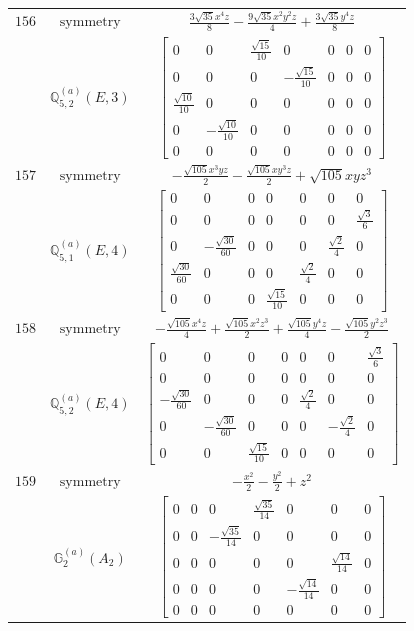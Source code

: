 \documentclass[fleqn,8pt,landscape]{jsarticle}
\begin{document}
\begin{longtable}{ccc}
$ 156 $ & $ \text{symmetry} $ & $ \frac{3 \sqrt{35} x^{4} z}{8} - \frac{9 \sqrt{35} x^{2} y^{2} z}{4} + \frac{3 \sqrt{35} y^{4} z}{8} $ \\
$  $ & $ \mathbb{Q}_{5,2}^{(a)}(E,3) $ & $ \begin{bmatrix} 0 & 0 & \frac{\sqrt{15}}{10} & 0 & 0 & 0 & 0 \\ 0 & 0 & 0 & - \frac{\sqrt{15}}{10} & 0 & 0 & 0 \\ \frac{\sqrt{10}}{10} & 0 & 0 & 0 & 0 & 0 & 0 \\ 0 & - \frac{\sqrt{10}}{10} & 0 & 0 & 0 & 0 & 0 \\ 0 & 0 & 0 & 0 & 0 & 0 & 0 \end{bmatrix} $ \\ \hline
$ 157 $ & $ \text{symmetry} $ & $ - \frac{\sqrt{105} x^{3} y z}{2} - \frac{\sqrt{105} x y^{3} z}{2} + \sqrt{105} x y z^{3} $ \\
$  $ & $ \mathbb{Q}_{5,1}^{(a)}(E,4) $ & $ \begin{bmatrix} 0 & 0 & 0 & 0 & 0 & 0 & 0 \\ 0 & 0 & 0 & 0 & 0 & 0 & \frac{\sqrt{3}}{6} \\ 0 & - \frac{\sqrt{30}}{60} & 0 & 0 & 0 & \frac{\sqrt{2}}{4} & 0 \\ \frac{\sqrt{30}}{60} & 0 & 0 & 0 & \frac{\sqrt{2}}{4} & 0 & 0 \\ 0 & 0 & 0 & \frac{\sqrt{15}}{10} & 0 & 0 & 0 \end{bmatrix} $ \\ \hline
$ 158 $ & $ \text{symmetry} $ & $ - \frac{\sqrt{105} x^{4} z}{4} + \frac{\sqrt{105} x^{2} z^{3}}{2} + \frac{\sqrt{105} y^{4} z}{4} - \frac{\sqrt{105} y^{2} z^{3}}{2} $ \\
$  $ & $ \mathbb{Q}_{5,2}^{(a)}(E,4) $ & $ \begin{bmatrix} 0 & 0 & 0 & 0 & 0 & 0 & \frac{\sqrt{3}}{6} \\ 0 & 0 & 0 & 0 & 0 & 0 & 0 \\ - \frac{\sqrt{30}}{60} & 0 & 0 & 0 & \frac{\sqrt{2}}{4} & 0 & 0 \\ 0 & - \frac{\sqrt{30}}{60} & 0 & 0 & 0 & - \frac{\sqrt{2}}{4} & 0 \\ 0 & 0 & \frac{\sqrt{15}}{10} & 0 & 0 & 0 & 0 \end{bmatrix} $ \\ \hline
$ 159 $ & $ \text{symmetry} $ & $ - \frac{x^{2}}{2} - \frac{y^{2}}{2} + z^{2} $ \\
$  $ & $ \mathbb{G}_{2}^{(a)}(A_{2}) $ & $ \begin{bmatrix} 0 & 0 & 0 & \frac{\sqrt{35}}{14} & 0 & 0 & 0 \\ 0 & 0 & - \frac{\sqrt{35}}{14} & 0 & 0 & 0 & 0 \\ 0 & 0 & 0 & 0 & 0 & \frac{\sqrt{14}}{14} & 0 \\ 0 & 0 & 0 & 0 & - \frac{\sqrt{14}}{14} & 0 & 0 \\ 0 & 0 & 0 & 0 & 0 & 0 & 0 \end{bmatrix} $ \\ \hline

\end{longtable}
\end{document}
